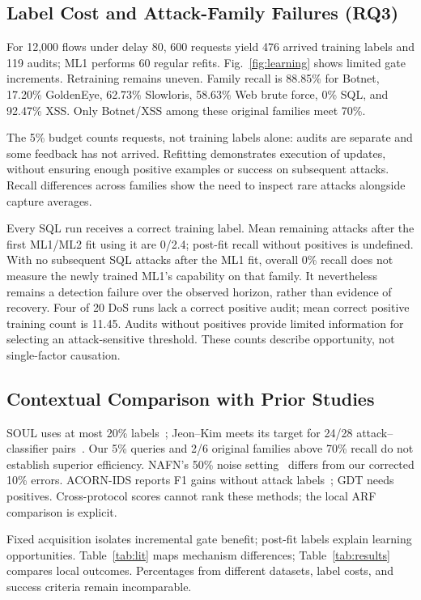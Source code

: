 \documentclass[conference]{IEEEtran}
\begin{document}
\subsection{Label Cost and Attack-Family Failures (RQ3)}
For 12,000 flows under delay 80, 600 requests yield 476 arrived training labels and 119 audits; ML1 performs 60 regular refits. Fig.~\ref{fig:learning} shows limited gate increments. Retraining remains uneven. Family recall is 88.85\% for Botnet, 17.20\% GoldenEye, 62.73\% Slowloris, 58.63\% Web brute force, 0\% SQL, and 92.47\% XSS. Only Botnet/XSS among these original families meet 70\%.

The 5\% budget counts requests, not training labels alone: audits are separate and some feedback has not arrived. Refitting demonstrates execution of updates, without ensuring enough positive examples or success on subsequent attacks. Recall differences across families show the need to inspect rare attacks alongside capture averages.

Every SQL run receives a correct training label. Mean remaining attacks after the first ML1/ML2 fit using it are 0/2.4; post-fit recall without positives is undefined. With no subsequent SQL attacks after the ML1 fit, overall 0\% recall does not measure the newly trained ML1's capability on that family. It nevertheless remains a detection failure over the observed horizon, rather than evidence of recovery. Four of 20 DoS runs lack a correct positive audit; mean correct positive training count is 11.45. Audits without positives provide limited information for selecting an attack-sensitive threshold. These counts describe opportunity, not single-factor causation.

\subsection{Contextual Comparison with Prior Studies}
SOUL uses at most 20\% labels~\cite{soul}; Jeon--Kim meets its target for 24/28 attack--classifier pairs~\cite{jeon}. Our 5\% queries and 2/6 original families above 70\% recall do not establish superior efficiency. NAFN's 50\% noise setting~\cite{nafn} differs from our corrected 10\% errors. ACORN-IDS reports F1 gains without attack labels~\cite{acorn}; GDT needs positives. Cross-protocol scores cannot rank these methods; the local ARF comparison is explicit.

Fixed acquisition isolates incremental gate benefit; post-fit labels explain learning opportunities. Table~\ref{tab:lit} maps mechanism differences; Table~\ref{tab:results} compares local outcomes. Percentages from different datasets, label costs, and success criteria remain incomparable.
\end{document}
